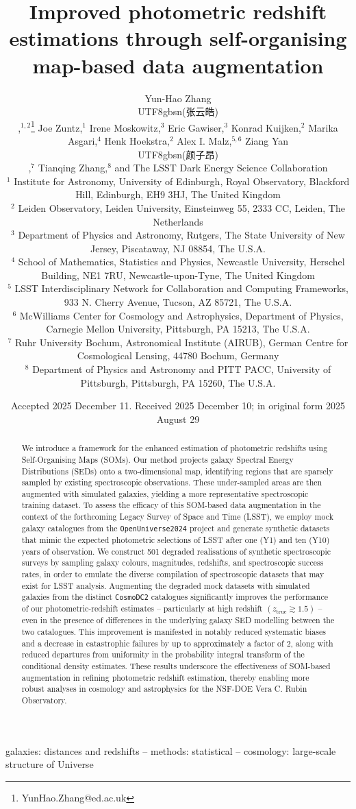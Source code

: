 \documentclass[fleqn, usenatbib]{mnras}
\title[SOM-based data augmentation]{Improved photometric redshift estimations through self-organising map-based data augmentation}
\author[Y.-H. Zhang et al.]{
Yun-Hao Zhang \begin{CJK*}{UTF8}{gbsn}(张云皓)\end{CJK*}\orcidlink{0000-0003-4916-6346},\(^{1, 2}\)\thanks{YunHao.Zhang@ed.ac.uk}
Joe Zuntz\orcidlink{0000-0001-9789-9646},\(^{1}\)
Irene Moskowitz\orcidlink{0000-0002-2206-8589},\(^{3}\)
Eric Gawiser\orcidlink{0000-0003-1530-8713},\(^{3}\)
Konrad Kuijken\orcidlink{0000-0002-3827-0175},\(^{2}\)
\newauthor
Marika Asgari\orcidlink{0000-0002-3064-083X},\(^{4}\) 
Henk Hoekstra\orcidlink{0000-0002-0641-3231},\(^{2}\)
Alex I. Malz\orcidlink{0000-0002-8676-1622},\(^{5, 6}\)
Ziang Yan \begin{CJK*}{UTF8}{gbsn}(颜子昂)\end{CJK*}\orcidlink{0000-0001-8043-5378},\(^{7}\)
Tianqing Zhang\orcidlink{0000-0002-5596-198X},\(^{8}\)
\newauthor
and The LSST Dark Energy Science Collaboration
\\
\(^{1}\) Institute for Astronomy, University of Edinburgh, Royal Observatory, Blackford Hill, Edinburgh, EH9 3HJ, The United Kingdom \\
\(^{2}\) Leiden Observatory, Leiden University, Einsteinweg 55, 2333 CC, Leiden, The Netherlands \\
\(^{3}\) Department of Physics and Astronomy, Rutgers, The State University of New Jersey, Piscataway, NJ 08854, The U.S.A. \\
\(^{4}\) School of Mathematics, Statistics and Physics, Newcastle University, Herschel Building, NE1 7RU, Newcastle-upon-Tyne, The United Kingdom \\
\(^{5}\) LSST Interdisciplinary Network for Collaboration and Computing Frameworks, 933 N. Cherry Avenue, Tucson, AZ 85721, The U.S.A. \\
\(^{6}\) McWilliams Center for Cosmology and Astrophysics, Department of Physics, Carnegie Mellon University, Pittsburgh, PA 15213, The U.S.A. \\
\(^{7}\) Ruhr University Bochum, Astronomical Institute (AIRUB), German Centre for Cosmological Lensing, 44780 Bochum, Germany \\
\(^{8}\) Department of Physics and Astronomy and PITT PACC, University of Pittsburgh, Pittsburgh, PA 15260, The U.S.A. \\
}
\date{Accepted 2025 December 11. Received 2025 December 10; in original form 2025 August 29}
\begin{document}
\label{firstpage}
\pagerange{\pageref{firstpage}--\pageref{lastpage}}
\maketitle



\begin{abstract}
We introduce a framework for the enhanced estimation of photometric redshifts using Self-Organising Maps (SOMs). Our method projects galaxy Spectral Energy Distributions (SEDs) onto a two-dimensional map, identifying regions that are sparsely sampled by existing spectroscopic observations. These under-sampled areas are then augmented with simulated galaxies, yielding a more representative spectroscopic training dataset. To assess the efficacy of this SOM-based data augmentation in the context of the forthcoming Legacy Survey of Space and Time (LSST), we employ mock galaxy catalogues from the \texttt{OpenUniverse2024} project and generate synthetic datasets that mimic the expected photometric selections of LSST after one (Y1) and ten (Y10) years of observation. We construct 501 degraded realisations of synthetic spectroscopic surveys by sampling galaxy colours, magnitudes, redshifts, and spectroscopic success rates, in order to emulate the diverse compilation of spectroscopic datasets that may exist for LSST analysis. Augmenting the degraded mock datasets with simulated galaxies from the distinct \texttt{CosmoDC2} catalogues significantly improves the performance of our photometric-redshift estimates -- particularly at high redshift \((z_\mathrm{true} \gtrsim 1.5)\) -- even in the presence of differences in the underlying galaxy SED modelling between the two catalogues. This improvement is manifested in notably reduced systematic biases and a decrease in catastrophic failures by up to approximately a factor of \(2\), along with reduced departures from uniformity in the probability integral transform of the conditional density estimates. These results underscore the effectiveness of SOM-based augmentation in refining photometric redshift estimation, thereby enabling more robust analyses in cosmology and astrophysics for the NSF-DOE Vera C. Rubin Observatory.
\end{abstract}

\begin{keywords}
galaxies: distances and redshifts -- methods: statistical -- cosmology: large-scale structure of Universe  
\end{keywords}
\end{document}
